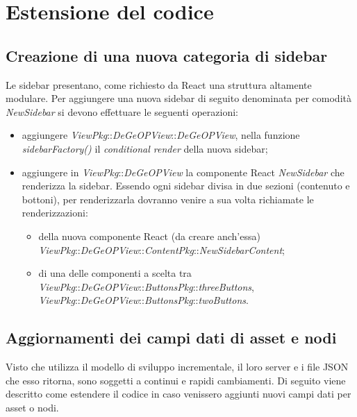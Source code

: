 \newpage

\section{Estensione del codice}

\subsection{Creazione di una nuova categoria di sidebar}
Le sidebar presentano, come richiesto da React una struttura altamente modulare.
Per aggiungere una nuova sidebar di seguito denominata per comodità \textit{NewSidebar} si devono effettuare le seguenti operazioni:
\begin{itemize}
	\item aggiungere \textit{ViewPkg}::\textit{DeGeOPView}::\textit{DeGeOPView}, nella funzione \textit{sidebarFactory()} il \textit{conditional render} della nuova sidebar;
	\item aggiungere in \textit{ViewPkg}::\textit{DeGeOPView} la componente React  \textit{NewSidebar} che renderizza la sidebar. Essendo ogni sidebar divisa in due sezioni (contenuto e bottoni), per renderizzarla dovranno venire a sua volta richiamate le renderizzazioni:
	\begin{itemize}
		\item della nuova componente React (da creare anch'essa) \textit{ViewPkg}::\textit{DeGeOPView}::\textit{ContentPkg}::\textit{NewSidebarContent};
		\item di una delle componenti a scelta tra \textit{ViewPkg}::\textit{DeGeOPView}::\textit{ButtonsPkg}::\textit{threeButtons}, \textit{ViewPkg}::\textit{DeGeOPView}::\textit{ButtonsPkg}::\textit{twoButtons}.
	\end{itemize}
\end{itemize}

\subsection{Aggiornamenti dei campi dati di asset e nodi}
Visto che \riskapp{} utilizza il modello di sviluppo incrementale, il loro server e i file JSON che esso ritorna, sono soggetti a continui e rapidi cambiamenti. Di seguito viene descritto come estendere il codice in caso venissero aggiunti nuovi campi dati per asset o nodi.

